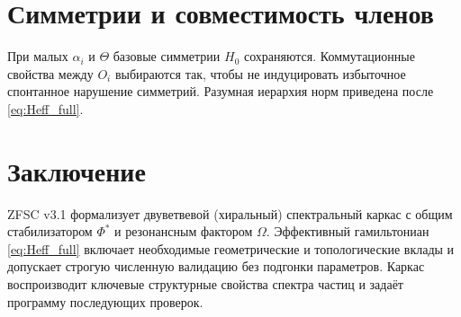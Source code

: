 \documentclass[a4paper,12pt]{article}
\def\Omega{Ω}%
\def\Theta{Θ}%
\def\Phi{Φ}%
\begin{document}
\section{Симметрии и совместимость членов}
При малых $\alpha_i$ и $\Theta$ базовые симметрии $H_0$ сохраняются. Коммутационные свойства между $O_i$ выбираются так, чтобы не индуцировать избыточное спонтанное нарушение симметрий. Разумная иерархия норм приведена после \eqref{eq:Heff_full}.

\section*{Заключение}
ZFSC v3.1 формализует двуветвевой (хиральный) спектральный каркас с общим стабилизатором $\Phi^*$ и резонансным фактором $\Omega$. Эффективный гамильтониан \eqref{eq:Heff_full} включает необходимые геометрические и топологические вклады и допускает строгую численную валидацию без подгонки параметров. Каркас воспроизводит ключевые структурные свойства спектра частиц и задаёт программу последующих проверок.
\end{document}
